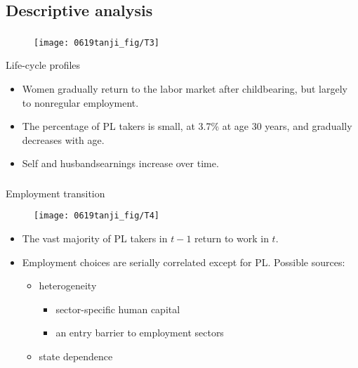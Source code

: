 \documentclass[dvipdfmx,11pt]{beamer}
\begin{document}
\subsection{Descriptive analysis}
\begin{frame}\frametitle{}
  \begin{figure}[h]
    \centering
    \texttt{[image: 0619tanji\_fig/T3]}
    \label{T2}
  \end{figure}
  Life-cycle profiles
  \begin{itemize}
    \small
    \item Women gradually return to the labor market after childbearing, but largely to nonregular employment.
    \item The percentage of PL takers is small, at 3.7\% at age 30 years, and gradually decreases with age.
    \item Self and husbandsearnings increase over time.
  \end{itemize}
\end{frame}

\begin{frame}\frametitle{}
  Employment transition
  \begin{figure}[h]
    \centering
    \texttt{[image: 0619tanji\_fig/T4]}
    \label{T2}
  \end{figure}
  \begin{itemize}
    \small
    \item The vast majority of PL takers in $t - 1$ return to work in $t$.
    \item Employment choices are serially correlated except for PL.
    Possible sources:
    \begin{itemize}
      \footnotesize
      \item heterogeneity
      \begin{itemize}
        \item sector-specific human capital
        \item an entry barrier to employment sectors
      \end{itemize}
      \item state dependence
    \end{itemize}
  \end{itemize}
\end{frame}
\end{document}
